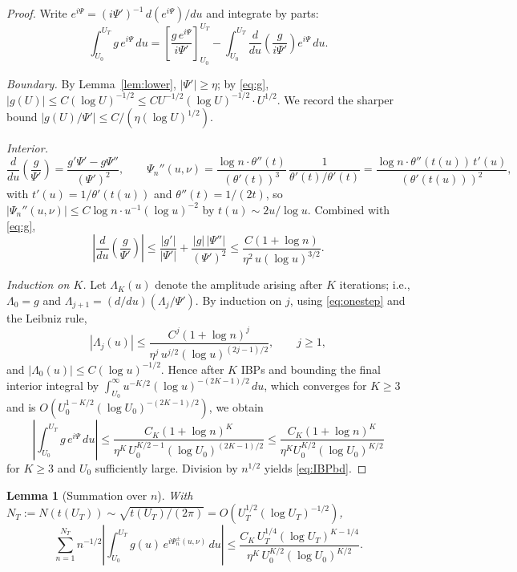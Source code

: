 \documentclass[11pt]{article}
\newtheorem{lemma}[theorem]{Lemma}
\theoremstyle{definition}
\theoremstyle{remark}
\begin{document}
\begin{proof}
Write $e^{i\Psi}=(i\Psi')^{-1}\,d(e^{i\Psi})/du$ and integrate by parts:
\[
  \int_{U_0}^{U_T}g\,e^{i\Psi}\,du
  =\left[\frac{g\,e^{i\Psi}}{i\Psi'}\right]_{U_0}^{U_T}
  -\int_{U_0}^{U_T}\frac{d}{du}\!\left(\frac{g}{i\Psi'}\right)e^{i\Psi}\,du.
\]

\emph{Boundary.}  By Lemma~\ref{lem:lower}, $|\Psi'|\ge\eta$; by
\eqref{eq:g}, $|g(U)|\le C(\log U)^{-1/2}\le C U^{-1/2}(\log U)^{-1/2}
\cdot U^{1/2}$.  We record the sharper bound
$|g(U)/\Psi'|\le C/(\eta(\log U)^{1/2})$.

\emph{Interior.}
\[
  \frac{d}{du}\!\left(\frac{g}{\Psi'}\right)
  =\frac{g'\Psi'-g\Psi''}{(\Psi')^2},\qquad
  \Psi_n''(u,\nu)=\frac{\log n\cdot\theta''(t)}{(\theta'(t))^3}\,\frac{1}{\theta'(t)/\theta'(t)}
  =\frac{\log n\cdot\theta''(t(u))\,t'(u)}{(\theta'(t(u)))^2},
\]
with $t'(u)=1/\theta'(t(u))$ and $\theta''(t)=1/(2t)$, so
$|\Psi_n''(u,\nu)|\le C\log n\cdot u^{-1}(\log u)^{-2}$ by
$t(u)\sim 2u/\log u$.  Combined with \eqref{eq:g},
\begin{equation}\label{eq:onestep}
  \left|\frac{d}{du}\!\left(\frac{g}{\Psi'}\right)\right|
  \le\frac{|g'|}{|\Psi'|}+\frac{|g|\,|\Psi''|}{(\Psi')^2}
  \le\frac{C(1+\log n)}{\eta^2\,u(\log u)^{3/2}}.
\end{equation}

\emph{Induction on $K$.}  Let $\Lambda_K(u)$ denote the amplitude
arising after $K$ iterations; i.e., $\Lambda_0=g$ and
$\Lambda_{j+1}=(d/du)(\Lambda_j/\Psi')$.  By induction on $j$, using
\eqref{eq:onestep} and the Leibniz rule,
\[
  |\Lambda_j(u)|\le\frac{C^j(1+\log n)^j}{\eta^{j}\,u^{j/2}(\log u)^{(2j-1)/2}},
  \qquad j\ge 1,
\]
and $|\Lambda_0(u)|\le C(\log u)^{-1/2}$.  Hence after $K$ IBPs and
bounding the final interior integral by $\int_{U_0}^\infty
u^{-K/2}(\log u)^{-(2K-1)/2}\,du$, which converges for $K\ge 3$ and is
$O(U_0^{1-K/2}(\log U_0)^{-(2K-1)/2})$, we obtain
\[
  \left|\int_{U_0}^{U_T}g\,e^{i\Psi}\,du\right|
  \le\frac{C_K(1+\log n)^K}{\eta^{K}\,U_0^{K/2-1}(\log U_0)^{(2K-1)/2}}
  \le\frac{C_K(1+\log n)^K}{\eta^K U_0^{K/2}(\log U_0)^{K/2}}
\]
for $K\ge 3$ and $U_0$ sufficiently large.  Division by $n^{1/2}$
yields \eqref{eq:IBPbd}.
\end{proof}

\begin{lemma}[Summation over $n$]\label{lem:sum}
With $N_T:=N(t(U_T))\sim\sqrt{t(U_T)/(2\pi)}=O(U_T^{1/2}(\log U_T)^{-1/2})$,
\[
  \sum_{n=1}^{N_T}n^{-1/2}\left|\int_{U_0}^{U_T}
    g(u)\,e^{i\Psi_n^\pm(u,\nu)}\,du\right|
  \le\frac{C_K\,U_T^{1/4}(\log U_T)^{K-1/4}}
    {\eta^K\,U_0^{K/2}(\log U_0)^{K/2}}.
\]
\end{lemma}
\end{document}
